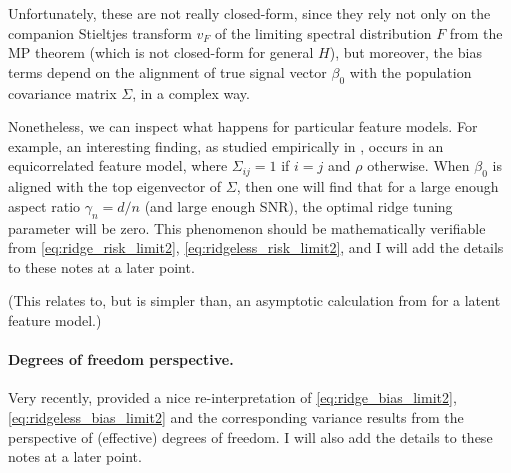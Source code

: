 \documentclass{article}
\begin{document}
Unfortunately, these are not really closed-form, since they rely not only on the
companion Stieltjes transform $v_F$ of the limiting spectral distribution $F$
from the MP theorem (which is not closed-form for general $H$), but moreover,
the bias terms depend on the alignment of true signal vector $\beta_0$ with the
population covariance matrix $\Sigma$, in a complex way.  

Nonetheless, we can inspect what happens for particular feature models. For
example, an interesting finding, as studied empirically in
\citet{kobak2020optimal}, occurs in an equicorrelated feature model, where
$\Sigma_{ij} = 1$ if $i=j$ and $\rho$ otherwise. When $\beta_0$ is aligned with  
the top eigenvector of $\Sigma$, then one will find that for a large enough
aspect ratio $\gamma_n = d/n$ (and large enough SNR), the optimal ridge tuning
parameter will be zero. This phenomenon should be mathematically verifiable from 
\eqref{eq:ridge_risk_limit2}, \eqref{eq:ridgeless_risk_limit2}, and I will add
the details to these notes at a later point.   

(This relates to, but is simpler than, an asymptotic calculation from
\citet{hastie2022surprises} for a latent feature model.) 

\paragraph{Degrees of freedom perspective.}

Very recently, \citet{bach2023high} provided a nice re-interpretation of
\eqref{eq:ridge_bias_limit2}, \eqref{eq:ridgeless_bias_limit2} and the
corresponding variance results from the perspective of (effective) degrees of
freedom. I will also add the details to these notes at a later point. 



\end{document}
